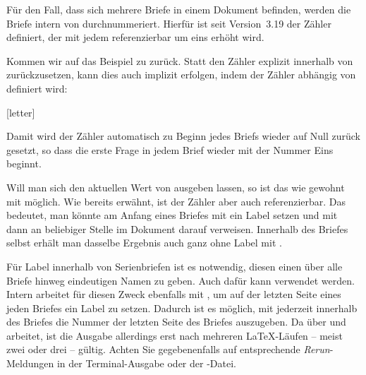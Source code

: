 \begin{Declaration}
\end{Declaration}
Für den Fall, dass
sich mehrere Briefe in einem Dokument befinden, werden die Briefe intern von
\KOMAScript{} durchnummeriert. Hierfür ist seit Version~3.19 der Zähler
 definiert, der mit jedem 
referenzierbar um eins erhöht wird.
\begin{Example}
  Kommen wir auf das Beispiel zu 
  zurück. Statt den Zähler explizit innerhalb von
   zurückzusetzen, kann dies auch implizit
  erfolgen, indem der Zähler  abhängig von 
  definiert wird:
\begin{lstcode}
  [letter]
  \newcommand{\Frage}[1]{%
    \par
    \refstepcounter{Frage}%
    \noindent
    \begin{tabularx}{\textwidth}{l@{}X}
      \theFrage:~ & #1\\
    \end{tabularx}%
  }%
\end{lstcode}
  Damit wird der Zähler automatisch zu Beginn jedes Briefs wieder auf Null
  zurück gesetzt, so dass die erste Frage in jedem Brief wieder mit der Nummer
  Eins beginnt.
\end{Example}

Will man sich den aktuellen Wert von  ausgeben lassen, so ist
das wie gewohnt mit  möglich. Wie bereits erwähnt, ist der
Zähler aber auch referenzierbar. Das bedeutet, man könnte am Anfang eines
Briefes mit  ein Label
setzen und mit  dann an beliebiger Stelle im
Dokument darauf verweisen. Innerhalb des Briefes selbst erhält man dasselbe
Ergebnis auch ganz ohne Label mit .

Für Label innerhalb von Serienbriefen ist es notwendig, diesen einen über alle
Briefe hinweg eindeutigen Namen zu geben. Auch dafür kann 
verwendet werden. Intern arbeitet \KOMAScript{} für diesen Zweck ebenfalls mit
, um auf der letzten Seite eines jeden Briefes ein Label zu
setzen. Dadurch ist es möglich, mit
 jederzeit innerhalb
des Briefes die Nummer der letzten Seite des Briefes auszugeben. Da
 über  und  arbeitet, ist
die Ausgabe allerdings erst nach mehreren \LaTeX-Läufen -- meist zwei oder
drei -- gültig. Achten Sie gegebenenfalls auf entsprechende
\emph{Rerun}-Meldungen in der Terminal-Ausgabe oder der -Datei.%
\EndIndexGroup


